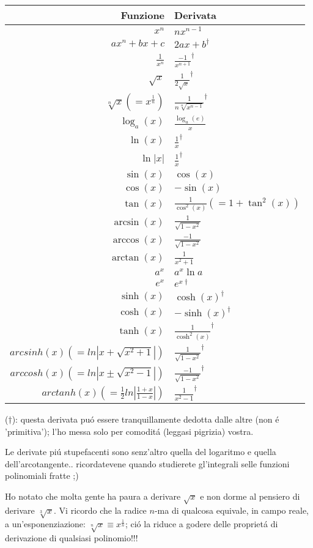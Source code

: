 \begin{tabular}{|r|l|}
\hline
Funzione & Derivata\\
\hline
\hline
$x^n$ & $nx^{n-1}$ \\
$ax^n+bx+c$ & $2ax+b^\dagger$ \\
$\frac{1}{x^n}$ & $\frac{-1}{x^{n+1}}^\dagger$ \\
$\sqrt{x}$ & $\frac{1}{2\sqrt{x}}^\dagger$ \\
$\sqrt[n]{x} (=x^{\frac{1}{n}})$ & $\frac{1}{n\sqrt[n]{x^{n-1}}}^\dagger$ \\
\hline
$\log_a(x)$ & $\frac{\log_a(e)}{x}$ \\
$\ln(x)$ & $\frac{1}{x} ^\dagger$ \\
$\ln|x|$ & $\frac{1}{x} ^\dagger$ \\
\hline
$\sin(x)$ & $\cos(x)$ \\
$\cos(x)$ & $-\sin(x)$ \\
$\tan(x)$ & $\frac{1}{\cos^2(x)} (=1+\tan^2(x))$ \\
\hline
$\arcsin(x)$ & $\frac{1}{\sqrt{1-x^2}}$ \\
$\arccos(x)$ & $\frac{-1}{\sqrt{1-x^2}}$ \\
$\arctan(x)$ & $\frac{1}{x^2+1}$ \\
\hline
$a^x$ & $a^x \ln a$ \\
$e^x$ & $e^{x \dagger}$\\
\hline
$\sinh(x)$ & $\cosh(x)^\dagger$ \\
$\cosh(x)$ & $-\sinh(x)^\dagger$ \\
$\tanh(x)$ & $\frac{1}{\cosh^2(x)}^\dagger$ \\
\hline
$arcsinh(x) (= ln|x + \sqrt{x^2+1}|)$ & $\frac{1}{\sqrt{1-x^2}} ^\dagger$ \\
$arccosh(x) (= ln|x \pm \sqrt{x^2-1}|)$ & $\frac{-1}{\sqrt{1-x^2}} ^\dagger$ \\
$arctanh(x) (= \frac{1}{2} ln|\frac{1+x}{1-x}|)$ & $\frac{1}{x^2-1} ^\dagger$ \\
\hline
\end{tabular}


{\small ($\dagger$): questa derivata pu\'o essere tranquillamente dedotta dalle altre (non \'e 'primitiva'); l'ho messa solo per comodit\'a (leggasi pigrizia) vostra.}

Le derivate pi\'u stupefacenti sono senz'altro quella del logaritmo e quella dell'arcotangente..
ricordatevene quando studierete gl'integrali selle funzioni polinomiali fratte ;)

Ho notato che molta gente ha paura a derivare $\sqrt{x}$ e non dorme al pensiero di derivare $\sqrt[3]{x}$.
Vi ricordo che la radice $n$-ma di qualcosa equivale, in campo reale, a un'esponenziazione: $\sqrt[n]{x} \equiv x^{\frac{1}{n}}$;
ci\'o la riduce a godere delle propriet\'a di derivazione di qualsiasi polinomio!!!


